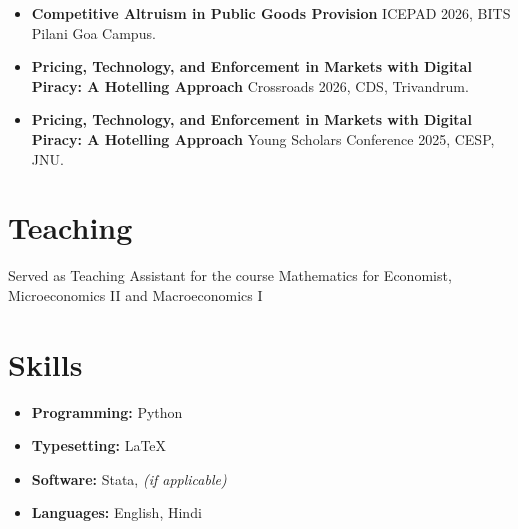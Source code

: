 \documentclass[11pt,letterpaper]{article}
\begin{document}
\begin{itemize}[leftmargin=1.1em, itemsep=0.5em, topsep=0pt]
  \item \textbf{Competitive Altruism in Public Goods Provision} ICEPAD 2026, BITS Pilani Goa Campus.
  \item \textbf{Pricing, Technology, and Enforcement in Markets with Digital Piracy: A Hotelling Approach} Crossroads 2026, CDS, Trivandrum.
  \item \textbf{Pricing, Technology, and Enforcement in Markets with Digital Piracy: A Hotelling Approach} Young Scholars Conference 2025, CESP, JNU.
\end{itemize}

\section*{Teaching}

Served as Teaching Assistant for the course Mathematics for Economist, Microeconomics II and Macroeconomics I

\section*{Skills}

\begin{itemize}[leftmargin=1.1em, itemsep=0.3em, topsep=0pt]
  \item \textbf{Programming:} Python
  \item \textbf{Typesetting:} LaTeX
  \item \textbf{Software:} Stata, \textit{(if applicable)}
  \item \textbf{Languages:} English, Hindi
\end{itemize}
\end{document}
